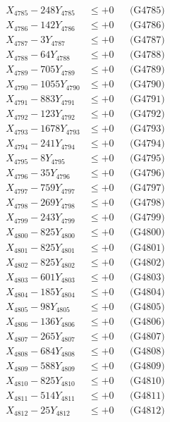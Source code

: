 \documentclass[a4paper,10pt]{article}
\begin{document}
{\begin{align}
X_{4785} - 248Y_{4785} &\leq +0 && \text{(G4785)} \\
X_{4786} - 142Y_{4786} &\leq +0 && \text{(G4786)} \\
X_{4787} - 3Y_{4787} &\leq +0 && \text{(G4787)} \\
X_{4788} - 64Y_{4788} &\leq +0 && \text{(G4788)} \\
X_{4789} - 705Y_{4789} &\leq +0 && \text{(G4789)} \\
X_{4790} - 1055Y_{4790} &\leq +0 && \text{(G4790)} \\
\allowbreak
X_{4791} - 883Y_{4791} &\leq +0 && \text{(G4791)} \\
X_{4792} - 123Y_{4792} &\leq +0 && \text{(G4792)} \\
X_{4793} - 1678Y_{4793} &\leq +0 && \text{(G4793)} \\
X_{4794} - 241Y_{4794} &\leq +0 && \text{(G4794)} \\
X_{4795} - 8Y_{4795} &\leq +0 && \text{(G4795)} \\
X_{4796} - 35Y_{4796} &\leq +0 && \text{(G4796)} \\
X_{4797} - 759Y_{4797} &\leq +0 && \text{(G4797)} \\
X_{4798} - 269Y_{4798} &\leq +0 && \text{(G4798)} \\
X_{4799} - 243Y_{4799} &\leq +0 && \text{(G4799)} \\
X_{4800} - 825Y_{4800} &\leq +0 && \text{(G4800)} \\
\allowbreak
X_{4801} - 825Y_{4801} &\leq +0 && \text{(G4801)} \\
X_{4802} - 825Y_{4802} &\leq +0 && \text{(G4802)} \\
X_{4803} - 601Y_{4803} &\leq +0 && \text{(G4803)} \\
X_{4804} - 185Y_{4804} &\leq +0 && \text{(G4804)} \\
X_{4805} - 98Y_{4805} &\leq +0 && \text{(G4805)} \\
X_{4806} - 136Y_{4806} &\leq +0 && \text{(G4806)} \\
X_{4807} - 265Y_{4807} &\leq +0 && \text{(G4807)} \\
X_{4808} - 684Y_{4808} &\leq +0 && \text{(G4808)} \\
X_{4809} - 588Y_{4809} &\leq +0 && \text{(G4809)} \\
X_{4810} - 825Y_{4810} &\leq +0 && \text{(G4810)} \\
\allowbreak
X_{4811} - 514Y_{4811} &\leq +0 && \text{(G4811)} \\
X_{4812} - 25Y_{4812} &\leq +0 && \text{(G4812)} \\

\end{align}}
\end{document}

